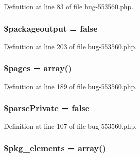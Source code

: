 \-Definition at line 83 of file bug-\/553560.\-php.

\hypertarget{classi_new_render_ae42e8e1aebbb7e9af6f8b463703e90a0}{
\subsubsection[{\$packageoutput}]{\setlength{\rightskip}{0pt plus 5cm}\$packageoutput = false}}\label{classi_new_render_ae42e8e1aebbb7e9af6f8b463703e90a0}


\-Definition at line 203 of file bug-\/553560.\-php.

\hypertarget{classi_new_render_a263621399c53f2952c2329ee13ad8e4e}{
\subsubsection[{\$pages}]{\setlength{\rightskip}{0pt plus 5cm}\$pages = array()}}\label{classi_new_render_a263621399c53f2952c2329ee13ad8e4e}


\-Definition at line 189 of file bug-\/553560.\-php.

\hypertarget{classi_new_render_a351b7c7ced5d5cd6ce87029cca64d150}{
\subsubsection[{\$parse\-Private}]{\setlength{\rightskip}{0pt plus 5cm}\$parse\-Private = false}}\label{classi_new_render_a351b7c7ced5d5cd6ce87029cca64d150}


\-Definition at line 107 of file bug-\/553560.\-php.

\hypertarget{classi_new_render_af833d646cb2d71e00831b24d1cbd9cdf}{
\subsubsection[{\$pkg\-\_\-elements}]{\setlength{\rightskip}{0pt plus 5cm}\$pkg\-\_\-elements = array()}}\label{classi_new_render_af833d646cb2d71e00831b24d1cbd9cdf}


